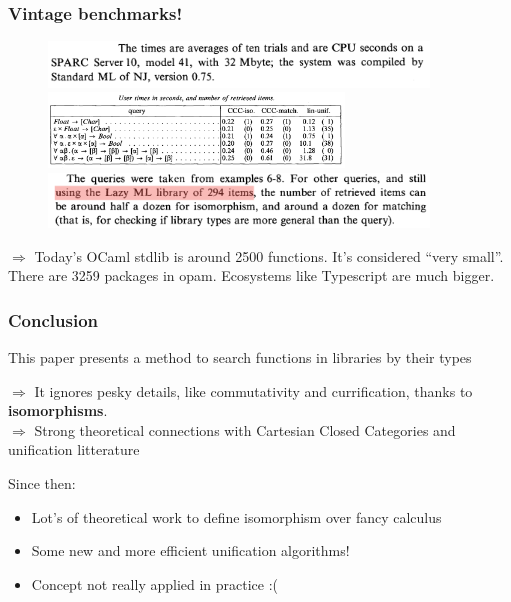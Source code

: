 \documentclass[aspectratio=169,dvipsnames,svgnames,10pt]{beamer}
\begin{document}
\begin{frame}
  \frametitle{Vintage benchmarks!}
  \begin{figure}
    \centering
    \includegraphics[width=0.9\textwidth]{benchmarks3}
    \includegraphics[width=0.7\textwidth]{benchmarks1}
    \includegraphics[width=0.9\textwidth]{benchmarks2}
  \end{figure}

  \pause
  $\Rightarrow$ Today's OCaml stdlib is around 2500 functions. It's considered ``very small''. There are 3259 packages in opam. Ecosystems like Typescript are much bigger.
\end{frame}

\begin{frame}
  \frametitle{Conclusion}

  This paper presents a method to search functions in libraries by their types

  $\Rightarrow$ It ignores pesky details, like commutativity and currification,
  thanks to {\bf isomorphisms}.\\
  $\Rightarrow$ Strong theoretical connections with Cartesian Closed Categories
  and unification litterature

  \vspace{2em}

  Since then:
  \begin{itemize}
  \item Lot's of theoretical work to define isomorphism over fancy calculus
  \item Some new and more efficient unification algorithms!
  \item Concept not really applied in practice :(
  \end{itemize}
  
  
\end{frame}
\end{document}
